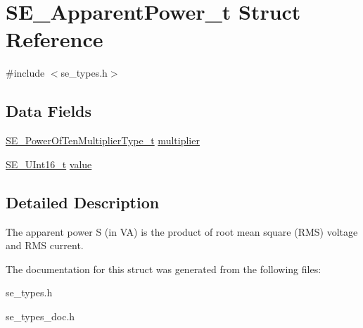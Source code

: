 \hypertarget{structSE__ApparentPower__t}{}\section{S\+E\+\_\+\+Apparent\+Power\+\_\+t Struct Reference}
\label{structSE__ApparentPower__t}


{\ttfamily \#include $<$se\+\_\+types.\+h$>$}

\subsection*{Data Fields}
\begin{DoxyCompactItemize}
\item 
\hyperlink{group__PowerOfTenMultiplierType_gaf0317b781dc8dbb9cb6ac4e44a14fdef}{S\+E\+\_\+\+Power\+Of\+Ten\+Multiplier\+Type\+\_\+t} \hyperlink{group__ApparentPower_gac045971a97fa5b740ae1bb7b27b6003e}{multiplier}
\item 
\hyperlink{group__UInt16_gac68d541f189538bfd30cfaa712d20d29}{S\+E\+\_\+\+U\+Int16\+\_\+t} \hyperlink{group__ApparentPower_ga3e723545220f4a3a11f93e67620b3bd3}{value}
\end{DoxyCompactItemize}


\subsection{Detailed Description}
The apparent power S (in VA) is the product of root mean square (R\+MS) voltage and R\+MS current. 

The documentation for this struct was generated from the following files\+:\begin{DoxyCompactItemize}
\item 
se\+\_\+types.\+h\item 
se\+\_\+types\+\_\+doc.\+h\end{DoxyCompactItemize}
